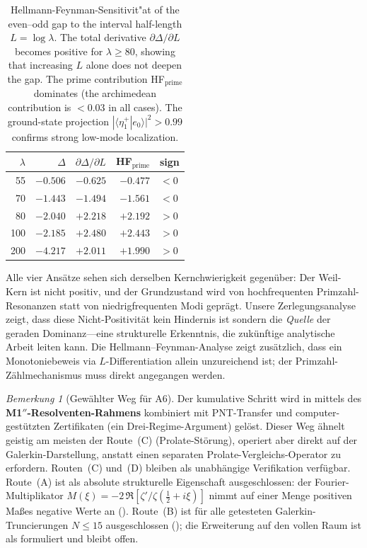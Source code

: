 ﻿\documentclass[12pt,a4paper]{article}
\theoremstyle{definition}
\theoremstyle{remark}
\newtheorem{remark}[theorem]{Bemerkung}
\begin{document}
\begin{table}[h]
\centering
\renewcommand{\arraystretch}{1.15}
\begin{tabular}{r|r|r|r|l}
$\lambda$ & $\Delta$ & $\partial\Delta/\partial L$ & HF$_{\mathrm{prime}}$ & sign \\\hline
55  & $-0.506$ & $-0.625$ & $-0.477$ & $<0$ \\
70  & $-1.443$ & $-1.494$ & $-1.561$ & $<0$ \\
80  & $-2.040$ & $+2.218$ & $+2.192$ & $>0$ \\
100 & $-2.185$ & $+2.480$ & $+2.443$ & $>0$ \\
200 & $-4.217$ & $+2.011$ & $+1.990$ & $>0$ \\
\end{tabular}
\caption{Hellmann-Feynman-Sensitivit"at of the even--odd gap to the interval half-length $L = \log\lambda$. The total derivative $\partial\Delta/\partial L$ becomes positive for $\lambda \geq 80$, showing that increasing $L$ alone does not deepen the gap. The prime contribution HF$_{\mathrm{prime}}$ dominates (the archimedean contribution is $< 0.03$ in all cases). The ground-state projection $|\langle \eta^+_1 | e_0 \rangle|^2 > 0.99$ confirms strong low-mode localization.}
\label{tab:hf-results}
\end{table}

Alle vier Ansätze sehen sich derselben Kernchwierigkeit gegenüber: Der Weil-Kern ist nicht positiv, und der Grundzustand wird von hochfrequenten Primzahl-Resonanzen statt von niedrigfrequenten Modi geprägt. Unsere Zerlegungsanalyse zeigt, dass diese Nicht-Positivität kein Hindernis ist sondern die \emph{Quelle} der geraden Dominanz---eine strukturelle Erkenntnis, die zukünftige analytische Arbeit leiten kann. Die Hellmann--Feynman-Analyse zeigt zusätzlich, dass ein Monotoniebeweis via $L$-Differentiation allein unzureichend ist; der Primzahl-Zählmechanismus muss direkt angegangen werden.

\begin{remark}[Gewählter Weg für A6]
Der kumulative Schritt wird in  mittels des \textbf{M1$''$-Resolventen-Rahmens} kombiniert mit PNT-Transfer und computer-gestützten Zertifikaten (ein Drei-Regime-Argument) gelöst. Dieser Weg ähnelt geistig am meisten der Route~(C) (Prolate-Störung), operiert aber direkt auf der Galerkin-Darstellung, anstatt einen separaten Prolate-Vergleichs-Operator zu erfordern. Routen~(C) und~(D) bleiben als unabhängige Verifikation verfügbar. Route~(A) ist als absolute strukturelle Eigenschaft ausgeschlossen: der Fourier-Multiplikator $M(\xi) = -2\,\Re[\zeta'/\zeta(\tfrac{1}{2}+i\xi)]$ nimmt auf einer Menge positiven Maßes negative Werte an (). Route~(B) ist für alle getesteten Galerkin-Truncierungen $N \leq 15$ ausgeschlossen (); die Erweiterung auf den vollen Raum ist als  formuliert und bleibt offen.
\end{remark}
\end{document}
